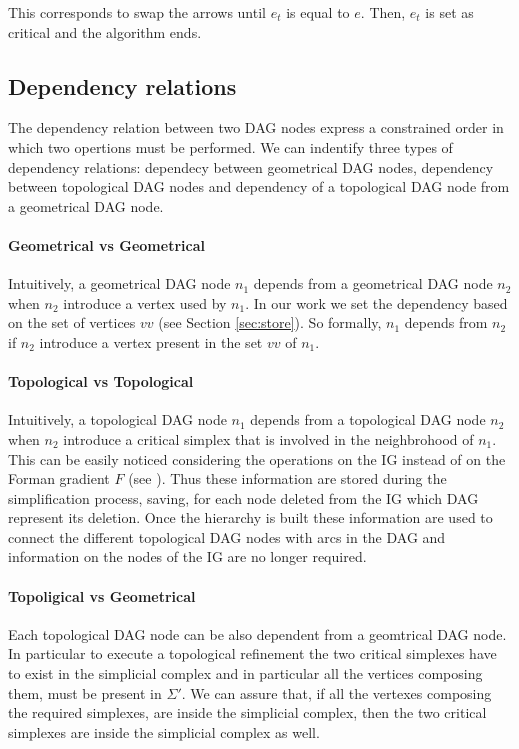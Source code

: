 \documentclass[preprint,5p,times,onecolumn]{article}
\begin{document}
This corresponds to swap the arrows until $e_t$ is equal to $e$. Then, $e_t$ is set as critical and the algorithm ends.


\subsection{Dependency relations}
\label{sec:dep}

The dependency relation between two DAG nodes express a constrained order in which two opertions must be performed. We can indentify three types of dependency relations: dependecy between geometrical DAG nodes, dependency between topological DAG nodes and dependency of a topological DAG node from a geometrical DAG node.

\paragraph{Geometrical vs Geometrical}
Intuitively, a geometrical DAG node $n_1$ depends from a geometrical DAG node $n_2$ when $n_2$ introduce a vertex used by $n_1$. In our work we set the dependency based on the set of vertices $vv$ (see Section \ref{sec:store}). So formally, $n_1$ depends from $n_2$ if $n_2$ introduce a vertex present in the set $vv$ of $n_1$.

\paragraph{Topological vs Topological}
Intuitively, a topological DAG node $n_1$ depends from a topological DAG node $n_2$ when $n_2$ introduce a critical simplex that is involved in the neighbrohood of $n_1$. This can be easily noticed considering the operations on the IG instead of on the Forman gradient $F$ (see \cite{Comi13a}). Thus these information are stored during the simplification process, saving, for each node deleted from the IG which DAG represent its deletion. Once the hierarchy is built these information are used to connect the different topological DAG nodes with arcs in the DAG and information on the nodes of the IG are no longer required.

\paragraph{Topoligical vs Geometrical}
Each topological DAG node can be also dependent from a geomtrical DAG node. In particular to execute a topological refinement the two critical simplexes have to exist in the simplicial complex and in particular all the vertices composing them, must be present in $\Sigma'$. We can assure that, if all the vertexes composing the required simplexes, are inside the simplicial complex, then the two critical simplexes are inside the simplicial complex as well.\\
\end{document}
